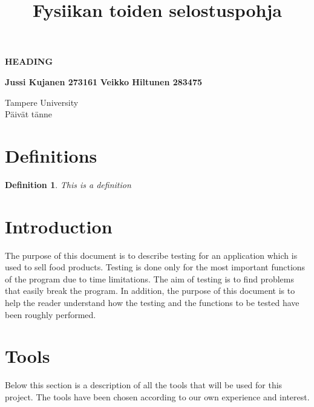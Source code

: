 \documentclass[a4paper, 12pt]{article}
\title{Fysiikan toiden selostuspohja}
\newtheorem{definition}{Definition}
\begin{document}
\begin{titlepage}
    \begin{center}
        \vspace*{1cm}
 
        \textbf{HEADING}
 
        \vspace{0.5cm}
       
             
        \vspace{1.5cm}

        \textbf{Jussi Kujanen 273161}
        \textbf{Veikko Hiltunen 283475}
 
        \vfill
        \vspace{0.8cm}
        Tampere University\\
        Päivät tänne
    \end{center}
 \end{titlepage} 



\newpage
\thispagestyle{empty}
\tableofcontents

\newpage
\clearpage
{} 

\section{Definitions}

\begin{definition}
    This is a definition
\end{definition}

\section{Introduction}

The purpose of this document is to describe testing for an application which is used to sell food products. Testing is done only for the most important 
functions of the program due to time limitations. The aim of testing is to find problems that easily break the program. In addition, the purpose of this 
document is to help the reader understand how the testing and the functions to be tested have been roughly performed. 

\section{Tools}

Below this section is a description of all the tools that will be used for this project. The tools have been chosen according to our own experience and interest. 
\end{document}
